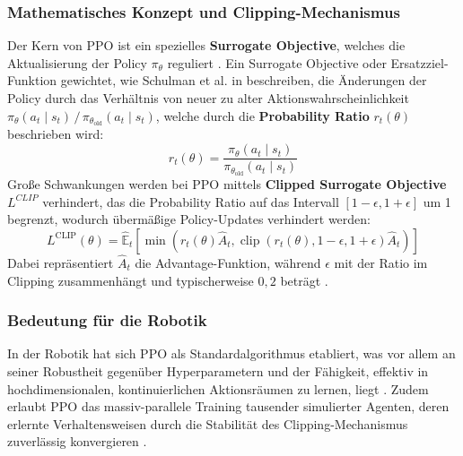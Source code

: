 \subsubsection{Mathematisches Konzept und Clipping-Mechanismus}
Der Kern von PPO ist ein spezielles \textbf{Surrogate Objective}, welches die Aktualisierung der Policy $\pi_\theta$ reguliert \cite{schulmanProximalPolicyOptimization2017, francois-lavetIntroductionDeepReinforcement2018}. Ein Surrogate Objective oder Ersatzziel-Funktion gewichtet, wie Schulman et al. in \cite{schulmanProximalPolicyOptimization2017} beschreiben, die Änderungen der Policy durch das Verhältnis von neuer zu alter Aktionswahrscheinlichkeit $\pi_\theta(a_t\mid s_t)\,/\,\pi_{\theta_{\mathrm{old}}}(a_t\mid s_t)$, welche durch die \textbf{Probability Ratio} $r_t(\theta)$ beschrieben wird:
\begin{equation}
\label{eq:ppo_probability_ratio}
	r_t(\theta) = \frac{\pi_{\theta}(a_t\mid s_t)}{\pi_{\theta_{\mathrm{old}}}(a_t\mid s_t)}
\end{equation}
Große Schwankungen werden bei PPO mittels \textbf{Clipped Surrogate Objective} $L^{CLIP}$ verhindert, das die Probability Ratio auf das Intervall $[1-\epsilon, 1+\epsilon]$ um 1 begrenzt, wodurch übermäßige Policy-Updates verhindert werden:
\begin{equation}
	L^{\mathrm{CLIP}}(\theta) = \hat{\mathbb{E}}_t\!\left[\min\!\left(r_t(\theta)\hat{A}_t,\operatorname{clip}\!\left(r_t(\theta),1-\epsilon,1+\epsilon\right)\hat{A}_t\right)\right]
\end{equation}
Dabei repräsentiert $\hat{A}_t$ die Advantage-Funktion, während $\epsilon$ mit der Ratio im Clipping zusammenhängt und typischerweise $0,2$ beträgt \cite{schulmanProximalPolicyOptimization2017}. 
\subsubsection{Bedeutung für die Robotik}
In der Robotik hat sich PPO als Standardalgorithmus etabliert, was vor allem an seiner Robustheit gegenüber Hyperparametern und der Fähigkeit, effektiv in hochdimensionalen, kontinuierlichen Aktionsräumen zu lernen, liegt \cite{tangDeepReinforcementLearning2024, schwarke2025rslrllearninglibraryrobotics}. Zudem erlaubt PPO das massiv-parallele Training tausender simulierter Agenten, deren erlernte Verhaltensweisen durch die Stabilität des Clipping-Mechanismus zuverlässig konvergieren \cite{rudin2022learningwalkminutesusing, schwarke2025rslrllearninglibraryrobotics}.

